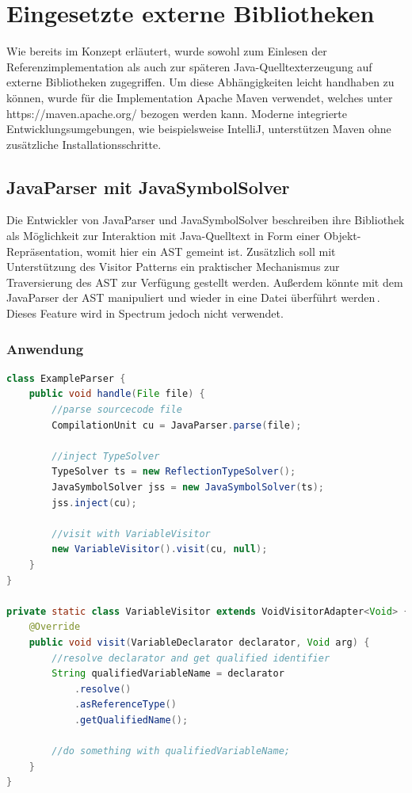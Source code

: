 \documentclass[12pt,oneside,a4paper,parskip]{scrbook}
\begin{document}
\section{Eingesetzte externe Bibliotheken}

Wie bereits im Konzept erläutert, wurde sowohl zum Einlesen der Referenzimplementation als auch zur späteren Java-Quelltexterzeugung auf externe Bibliotheken zugegriffen. Um diese Abhängigkeiten leicht handhaben zu können, wurde für die Implementation Apache Maven verwendet, welches unter https://maven.apache.org/ bezogen werden kann. Moderne integrierte Entwicklungsumgebungen, wie beispielsweise IntelliJ, unterstützen Maven ohne zusätzliche Installationsschritte.

\subsection{JavaParser mit JavaSymbolSolver}

Die Entwickler von JavaParser und JavaSymbolSolver beschreiben ihre Bibliothek als Möglichkeit zur Interaktion mit Java-Quelltext in Form einer Objekt-Repräsentation, womit hier ein AST gemeint ist. Zusätzlich soll mit Unterstützung des Visitor Patterns ein praktischer Mechanismus zur Traversierung des AST zur Verfügung gestellt werden. Außerdem könnte mit dem JavaParser der AST manipuliert und wieder in eine Datei überführt werden\,\cite[S.\,1]{javaparser2017}. Dieses Feature wird in Spectrum jedoch nicht verwendet.

\subsubsection{Anwendung}

\begin{lstlisting}[label=lst:jpVisit,
language=java,
firstnumber=1,
caption=Beispielhafte Initialisierung und Verwendung des JavaParsers und des JavaSymbolSolvers]
class ExampleParser {
	public void handle(File file) {
		//parse sourcecode file
		CompilationUnit cu = JavaParser.parse(file);
		
		//inject TypeSolver
		TypeSolver ts = new ReflectionTypeSolver();
		JavaSymbolSolver jss = new JavaSymbolSolver(ts);
		jss.inject(cu);
		
		//visit with VariableVisitor
		new VariableVisitor().visit(cu, null);
	}
}
	
private static class VariableVisitor extends VoidVisitorAdapter<Void> {
	@Override
	public void visit(VariableDeclarator declarator, Void arg) {
		//resolve declarator and get qualified identifier
		String qualifiedVariableName = declarator
			.resolve()
			.asReferenceType()
			.getQualifiedName();
		
		//do something with qualifiedVariableName;
	}
}
\end{lstlisting}
\end{document}
